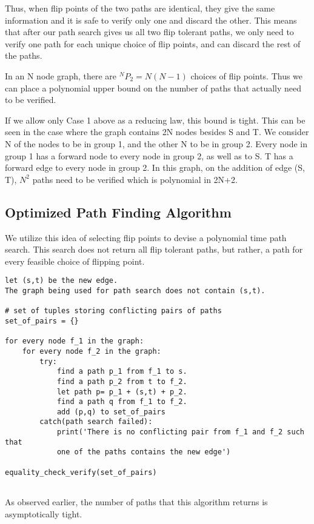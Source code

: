 \documentclass{article}
\begin{document}
Thus, when flip points of the two paths are identical, they give the same information and it is safe to verify only one and discard the other. This means that after our path search gives us all two flip tolerant paths, we only need to verify one path for each unique choice of flip points, and can discard the rest of the paths.

In an N node graph, there are $^NP_2 = N(N-1)$ choices of flip points. Thus we can place a polynomial upper bound on the number of paths that actually need to be verified.

If we allow only Case 1 above as a reducing law, this bound is tight. 
This can be seen in the case where the graph contains 2N nodes besides S and T. We consider N of the nodes to be in group 1, and the other N to be in group 2. Every node in group 1 has a forward node to every node in group 2, as well as to S. T has a forward edge to every node in group 2. In this graph, on the addition of edge (S, T), $N^2$ paths need to be verified which is polynomial in 2N+2.

\subsection{Optimized Path Finding Algorithm}
We utilize this idea of selecting flip points to devise a polynomial time path search. This search does not return all flip tolerant paths, but rather, a path for every feasible choice of flipping point.

\begin{verbatim}
let (s,t) be the new edge.
The graph being used for path search does not contain (s,t).

# set of tuples storing conflicting pairs of paths
set_of_pairs = {}

for every node f_1 in the graph:
    for every node f_2 in the graph:
        try:
            find a path p_1 from f_1 to s.
            find a path p_2 from t to f_2.
            let path p= p_1 + (s,t) + p_2.
            find a path q from f_1 to f_2.
            add (p,q) to set_of_pairs    
        catch(path search failed):
            print('There is no conflicting pair from f_1 and f_2 such that
            one of the paths contains the new edge')

equality_check_verify(set_of_pairs)
            
\end{verbatim}

As observed earlier, the number of paths that this algorithm returns is asymptotically tight.
\end{document}
